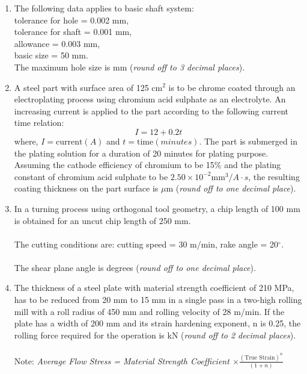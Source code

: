 \documentclass[12pt,onecolumn]{article}
\begin{document}
\begin{enumerate}
    \item The following data applies to basic shaft system:\\
          tolerance for hole = 0.002 mm,\\
          tolerance for shaft = 0.001 mm,\\
          allowance = 0.003 mm,\\
          basic size = 50 mm.\\
          The maximum hole size is \underline{\hspace{2cm}} mm (\textit{round off to 3 decimal places}).

    \item A steel part with surface area of 125 cm$^2$ is to be chrome coated through an electroplating process using chromium acid sulphate as an electrolyte. An increasing current is applied to the part according to the following current time relation:
          \[ I = 12 + 0.2t \] where, $I = \text{current}(A)$ and $t = \text{time}(minutes)$. The part is submerged in the plating solution for a duration of 20 minutes for plating purpose. Assuming the cathode efficiency of chromium to be 15\% and the plating constant of chromium acid sulphate to be $2.50\times10^{-2} \text{mm}^3/A\cdot s$, the resulting coating thickness on the part surface is \underline{\hspace{2cm}} $\mu$m (\textit{round off to one decimal place}).

    \item In a turning process using orthogonal tool geometry, a chip length of 100 mm is obtained for an uncut chip length of 250 mm.\\\\
          The cutting conditions are: cutting speed = 30 m/min, rake angle = 20$^\circ$.\\\\
          The shear plane angle is \underline{\hspace{2cm}} degrees (\textit{round off to one decimal place}).

    \item The thickness of a steel plate with material strength coefficient of 210 MPa, has to be reduced from 20 mm to 15 mm in a single pass in a two-high rolling mill with a roll radius of 450 mm and rolling velocity of 28 m/min. If the plate has a width of 200 mm and its strain hardening exponent, n is 0.25, the rolling force required for the operation is \underline{\hspace{2cm}} kN (\textit{round off to 2 decimal places}).\\\\
          Note: \textit{Average Flow Stress = Material Strength Coefficient $\times\frac{(\text{True Strain})^n}{(1+n)}$}


\end{enumerate}
\end{document}
